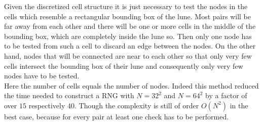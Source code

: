    Given the discretized cell structure it is just necessary to test the nodes in the cells which
    resemble a rectangular bounding box of the lune. Most pairs will be
    far away from each other and there will be one or more cells in the
    middle of the bounding box, which are completely inside the lune so.
    Then only one node has to be tested from such a cell to discard an
    edge between the nodes. On the other hand, nodes that will be connected
    are near to each other so that only very few cells intersect the bounding
    box of their lune and consequently only very few nodes have to be tested.\\
    Here the number of cells equals the number of nodes.
    Indeed this method reduced the time needed to construct a RNG with
    \(N=32^2\) and \(N=64^2\) by a factor of
    over \(15\) respectively \(40\). Though the complexity is still of
    order \(O(N^2)\) in the best case, because for every pair at least
    one check has to be performed.

